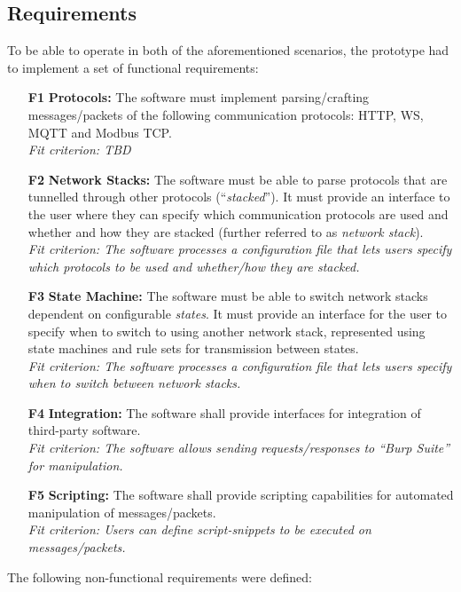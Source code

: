\subsection{Requirements}
To be able to operate in both of the aforementioned scenarios, the prototype had to implement a set of functional requirements:
\begin{itemize}
    \item [\textbf{F1}] \textbf{Protocols:} The software must implement parsing/crafting messages/packets of the following communication protocols: \ac{HTTP}, \ac{WS}, \ac{MQTT} and Modbus \ac{TCP}. \\
    \textit{Fit criterion: TBD} %
    \item [\textbf{F2}] \textbf{Network Stacks:} The software must be able to parse protocols that are tunnelled through other protocols (\enquote{\emph{stacked}}). It must provide an interface to the user where they can specify which communication protocols are used and whether and how they are stacked (further referred to as \emph{network stack}).\\
    \textit{Fit criterion: The software processes a configuration file that lets users specify which protocols to be used and whether/how they are stacked.} 
    \item [\textbf{F3}] \textbf{State Machine:} The software must be able to switch network stacks dependent on configurable \emph{states}. It must provide an interface for the user to specify when to switch to using another network stack, represented using state machines and rule sets for transmission between states.\\
    \textit{Fit criterion: The software processes a configuration file that lets users specify when to switch between network stacks.}
    \item [\textbf{F4}] \textbf{Integration:} The software shall provide interfaces for integration of third-party software.\\
    \textit{Fit criterion: The software allows sending requests/responses to \enquote{Burp Suite} for manipulation.}
    \item [\textbf{F5}] \textbf{Scripting:} The software shall provide scripting capabilities for automated manipulation of messages/packets.\\
    \textit{Fit criterion: Users can define script-snippets to be executed on messages/packets.}
\end{itemize}

The following non-functional requirements were defined:

